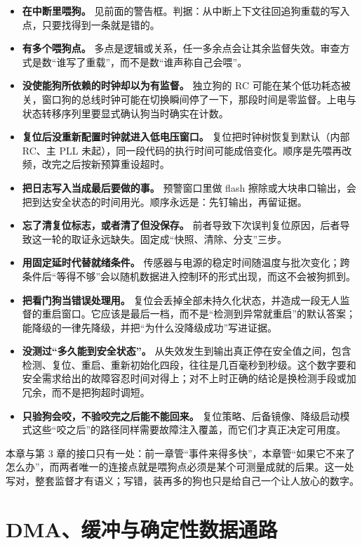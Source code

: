 \documentclass[12pt,a4paper,fontset=fandol]{ctexbook}
\begin{document}
\begin{itemize}
\item \textbf{在中断里喂狗。} 见前面的警告框。判据：从中断上下文往回追狗重载的写入点，只要找得到一条就是错的。
\item \textbf{有多个喂狗点。} 多点是逻辑或关系，任一多余点会让其余监督失效。审查方式是数``谁写了重载''，而不是数``谁声称自己会喂''。
\item \textbf{没使能狗所依赖的时钟却以为有监督。} 独立狗的 RC 可能在某个低功耗态被关，窗口狗的总线时钟可能在切换瞬间停了一下，那段时间是零监督。上电与状态转移序列里要显式确认狗当时确实在计数。
\item \textbf{复位后没重新配置时钟就进入低电压窗口。} 复位把时钟树恢复到默认（内部 RC、主 PLL 未起），同一段代码的执行时间可能成倍变化。顺序是先喂再改频，改完之后按新预算重设超时。
\item \textbf{把日志写入当成最后要做的事。} 预警窗口里做 flash 擦除或大块串口输出，会把到达安全状态的时间用光。顺序永远是：先钉输出，再留证据。
\item \textbf{忘了清复位标志，或者清了但没保存。} 前者导致下次误判复位原因，后者导致这一轮的取证永远缺失。固定成``快照、清除、分支''三步。
\item \textbf{用固定延时代替就绪条件。} 传感器与电源的稳定时间随温度与批次变化；跨条件后``等得不够''会以随机数据进入控制环的形式出现，而这不会被狗抓到。
\item \textbf{把看门狗当错误处理用。} 复位会丢掉全部未持久化状态，并造成一段无人监督的重启窗口。它应该是最后一档，而不是``检测到异常就重启''的默认答案；能降级的一律先降级，并把``为什么没降级成功''写进证据。
\item \textbf{没测过``多久能到安全状态''。} 从失效发生到输出真正停在安全值之间，包含检测、复位、重启、重新初始化四段，往往是几百毫秒到秒级。这个数字要和安全需求给出的故障容忍时间对得上；对不上时正确的结论是换检测手段或加冗余，而不是把狗超时调短。
\item \textbf{只验狗会咬，不验咬完之后能不能回来。} 复位策略、后备镜像、降级启动模式这些``咬之后''的路径同样需要故障注入覆盖，而它们才真正决定可用度。
\end{itemize}

本章与第 3 章的接口只有一处：前一章管``事件来得多快''，本章管``如果它不来了怎么办''，而两者唯一的连接点就是喂狗点必须是某个可测量成就的后果。这一处写对，整套监督才有语义；写错，装再多的狗也只是给自己一个让人放心的数字。

\chapter{DMA、缓冲与确定性数据通路}
\end{document}
